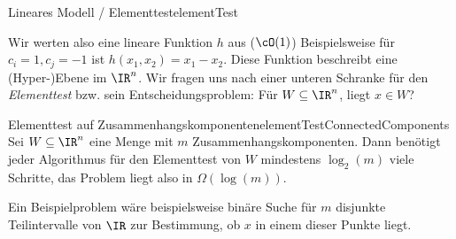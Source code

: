 \documentclass[language=ngerman,algolist,acrolist]{TemplateLecture}
\begin{document}
\begin{prob}{Lineares Modell / Elementtest}{elementTest}
\end{prob}
Wir werten also eine lineare Funktion $h$ aus ($\cO(1)$) Beispielsweise für $c_i = 1, c_j = -1$ ist $h(x_1, x_2) = x_1 - x_2$. Diese Funktion beschreibt eine (Hyper-)Ebene im $\IR^n$. Wir fragen uns nach einer unteren Schranke für den \emph{Elementtest} bzw. sein Entscheidungsproblem: Für $W \subseteq \IR^n$, liegt $x \in W$?

\begin{thm}{Elementtest auf Zusammenhangskomponenten}{elementTestConnectedComponents}
    Sei $W \subseteq \IR^n$ eine Menge mit $m$ Zusammenhangskomponenten. Dann benötigt jeder Algorithmus für den Elementtest von $W$ mindestens $\log_2(m)$ viele Schritte, das Problem liegt also in $\Omega(\log(m))$.
\end{thm}
Ein Beispielproblem wäre beispielsweise binäre Suche für $m$ disjunkte Teilintervalle von $\IR$ zur Bestimmung, ob $x$ in einem dieser Punkte liegt.
\end{document}
